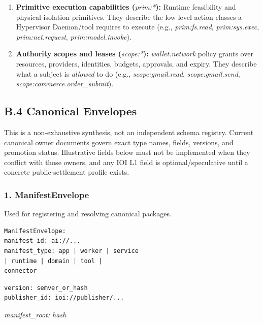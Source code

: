 \documentclass[
  11pt,
]{article}
\providecommand{\tightlist}{%
  \setlength{\itemsep}{0pt}\setlength{\parskip}{0pt}}
\begin{document}
\begin{enumerate}
\def\labelenumi{\arabic{enumi}.}
\tightlist
\item
  \textbf{Primitive execution capabilities (}\emph{prim:*}\textbf{):}
  Runtime feasibility and physical isolation primitives. They describe
  the low-level action classes a Hypervisor Daemon/tool requires to
  execute (e.g., \emph{prim:fs.read}, \emph{prim:sys.exec},
  \emph{prim:net.request}, \emph{prim:model.invoke}).
\item
  \textbf{Authority scopes and leases (}\emph{scope:*}\textbf{):}
  \emph{wallet.network} policy grants over resources, providers,
  identities, budgets, approvals, and expiry. They describe what a
  subject is \emph{allowed} to do (e.g., \emph{scope:gmail.read},
  \emph{scope:gmail.send}, \emph{scope:commerce.order\_submit}).
\end{enumerate}

\hypertarget{b.4-canonical-envelopes}{%
\subsection{B.4 Canonical Envelopes}\label{b.4-canonical-envelopes}}

This is a non-exhaustive synthesis, not an independent schema registry.
Current canonical owner documents govern exact type names, fields, versions,
and promotion status. Illustrative fields below must not be implemented when
they conflict with those owners, and any IOI L1 field is optional/speculative
until a concrete public-settlement profile exists.

\hypertarget{manifestenvelope}{%
\subsubsection{1. ManifestEnvelope}\label{manifestenvelope}}

Used for registering and resolving canonical packages.

\begin{lstlisting}[language={},basicstyle=\ttfamily\scriptsize]
ManifestEnvelope:
manifest_id: ai://...
manifest_type: app | worker | service
| runtime | domain | tool |
connector
\end{lstlisting}

\begin{lstlisting}[language=rustioi]
version: semver_or_hash
publisher_id: ioi://publisher/...
\end{lstlisting}
\emph{manifest\_root: hash}
\end{document}
